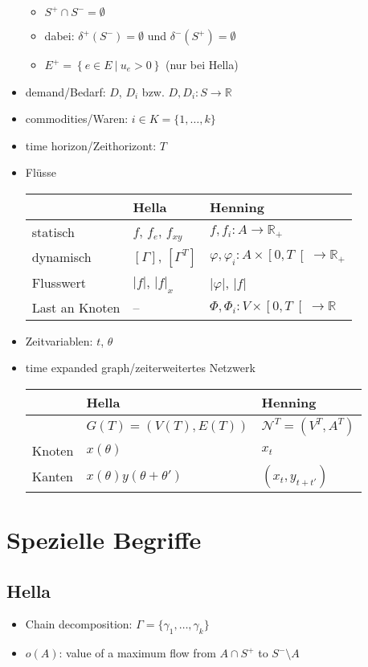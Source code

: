\documentclass[12pt, a4paper]{article}
\newcommand{\R}{\mathbb{R}}
\newcommand{\ropen}[1]{\ensuremath{\left[#1\right[}}
\newcommand{\func}[3]{\ensuremath{{#1} \colon {#2} \to {#3}}}
\newcommand{\graph}{\mathcal{N}}
\newcommand{\outEdges}{\delta^+}
\newcommand{\inEdges}{\delta^-}
\newcommand{\tExp}[1]{\ensuremath{\graph^{#1}}}
\newcommand{\setDef}[2]{\left\{{#1} \:|\: {#2}\right\}}
\begin{document}
\begin{itemize}
\begin{itemize}
	        \item $S^+ \cap S^- = \emptyset$
	        \item dabei: $\outEdges(S^-) = \emptyset$ und $\inEdges(S^+) = \emptyset$
	        \item $E^+ = \setDef{e \in E}{u_e > 0}$ (nur bei Hella)
	    \end{itemize}
    \item demand/Bedarf: $D$, $D_i$ bzw. $\func{D, D_i}{S}{\R}$
    \item commodities/Waren: $i \in K = \{1, \ldots, k\}$
    \item time horizon/Zeithorizont: $T$
    \item Flüsse \\
    	\begin{tabular}{l|l|l}
    		 & Hella & Henning \\ \hline
            statisch & $f$, $f_e$, $f_{xy}$ & $\func{f, f_i}{A}{\R_+}$ \\
    		dynamisch & $\left[ \Gamma \right]$, $\left[ \Gamma^T \right]$
    		            & $\func{\varphi, \varphi_i}{A \times \ropen{0, T}}{\R_+}$ \\
    		Flusswert & $|f|$, $|f|_x$ & $|\varphi|$, $|f|$ \\
    		Last an Knoten & -- & $\func{\Phi, \Phi_i}{V \times \ropen{0, T}}{\R}$
    	\end{tabular}
	\item Zeitvariablen: $t$, $\theta$
	\item time expanded graph/zeiterweitertes Netzwerk\\
    	\begin{tabular}{l|l|l}
    		& Hella & Henning \\ \hline
            & $G(T) = (V(T), E(T))$ & $\tExp{T} = (V^T, A^T)$ \\
            Knoten & $x(\theta)$ & $x_t$ \\
            Kanten & $x(\theta)y(\theta + \theta')$ & $(x_t, y_{t + t'})$
    	\end{tabular}
    
    
\end{itemize}

\section*{Spezielle Begriffe}
\subsection*{Hella}
\begin{itemize}
    \item Chain decomposition: $\Gamma = \{\gamma_1,\ldots,\gamma_k\}$
    \item $o(A)$: value of a maximum flow from $A \cap S^+$ to $S^- \setminus A$
\end{itemize}
\end{document}
